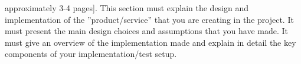 


approximately 3-4 pages]. This section
must explain the design and implementation of the ”product/service” that you are creating
in the project. It must present the main design choices and assumptions that you have
made. It must give an overview of the implementation made and explain in detail the key
components of your implementation/test setup.

\pagebreak
